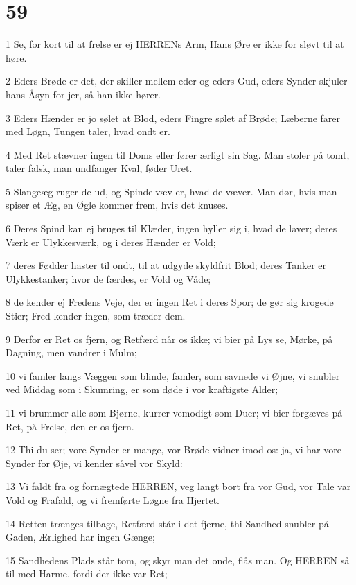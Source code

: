 \chapter{59}

\par 1 Se, for kort til at frelse er ej HERRENs Arm, Hans Øre er ikke for sløvt til at høre.
\par 2 Eders Brøde er det, der skiller mellem eder og eders Gud, eders Synder skjuler hans Åsyn for jer, så han ikke hører.
\par 3 Eders Hænder er jo sølet at Blod, eders Fingre sølet af Brøde; Læberne farer med Løgn, Tungen taler, hvad ondt er.
\par 4 Med Ret stævner ingen til Doms eller fører ærligt sin Sag. Man stoler på tomt, taler falsk, man undfanger Kval, føder Uret.
\par 5 Slangeæg ruger de ud, og Spindelvæv er, hvad de væver. Man dør, hvis man spiser et Æg, en Øgle kommer frem, hvis det knuses.
\par 6 Deres Spind kan ej bruges til Klæder, ingen hyller sig i, hvad de laver; deres Værk er Ulykkesværk, og i deres Hænder er Vold;
\par 7 deres Fødder haster til ondt, til at udgyde skyldfrit Blod; deres Tanker er Ulykkestanker; hvor de færdes, er Vold og Våde;
\par 8 de kender ej Fredens Veje, der er ingen Ret i deres Spor; de gør sig krogede Stier; Fred kender ingen, som træder dem.
\par 9 Derfor er Ret os fjern, og Retfærd når os ikke; vi bier på Lys se, Mørke, på Dagning, men vandrer i Mulm;
\par 10 vi famler langs Væggen som blinde, famler, som savnede vi Øjne, vi snubler ved Middag som i Skumring, er som døde i vor kraftigste Alder;
\par 11 vi brummer alle som Bjørne, kurrer vemodigt som Duer; vi bier forgæves på Ret, på Frelse, den er os fjern.
\par 12 Thi du ser; vore Synder er mange, vor Brøde vidner imod os: ja, vi har vore Synder for Øje, vi kender såvel vor Skyld:
\par 13 Vi faldt fra og fornægtede HERREN, veg langt bort fra vor Gud, vor Tale var Vold og Frafald, og vi fremførte Løgne fra Hjertet.
\par 14 Retten trænges tilbage, Retfærd står i det fjerne, thi Sandhed snubler på Gaden, Ærlighed har ingen Gænge;
\par 15 Sandhedens Plads står tom, og skyr man det onde, flås man. Og HERREN så til med Harme, fordi der ikke var Ret;
